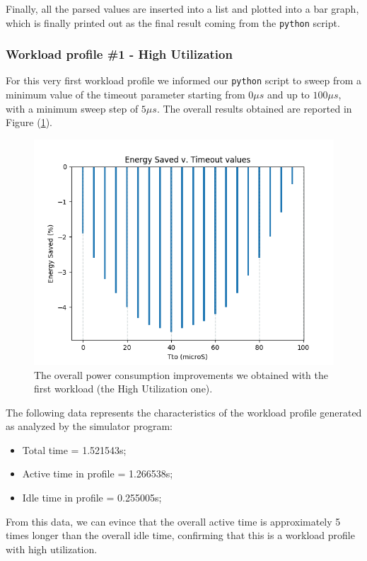 \documentclass[a4paper]{article}
\begin{document}
            Finally, all the parsed values are inserted into a list and plotted into a bar graph, which is finally printed out as the final result coming from the \texttt{python} script.

        \subsubsection{Workload profile \#1 - High Utilization}
            For this very first workload profile we informed our \texttt{python} script to sweep from a minimum value of the timeout parameter starting from $0 \mu s$ and up to $100 \mu s$, with a minimum sweep step of $5 \mu s$. The overall results obtained are reported in Figure (\ref{fig:Idle_case1}).

            \begin{figure}[htp]
                \centering
                \includegraphics[width=0.5 \columnwidth]{./screenshots/Idle_case1.png}
                \caption{
                        \label{fig:Idle_case1}
                        The overall power consumption improvements we obtained with the first workload (the High Utilization one).
                }
            \end{figure}

            The following data represents the characteristics of the workload profile generated as analyzed by the simulator program:
            \begin{itemize}
                \item Total time = 1.521543s;
                \item Active time in profile = 1.266538s;
                \item Idle time in profile = 0.255005s;
            \end{itemize}

            From this data, we can evince that the overall active time is approximately 5 times longer than the overall idle time, confirming that this is a workload profile with high utilization.
\end{document}

